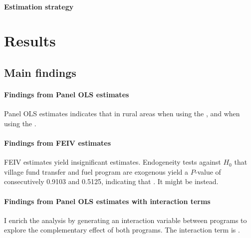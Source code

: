 \documentclass[letterpaper,12pt,leqno]{article}
\begin{document}
\paragraph{Estimation strategy}

\section{Results}\label{s:result}
\subsection{Main findings}\label{ss:findings}

\paragraph{Findings from Panel OLS estimates}
        Panel OLS estimates indicates that  in rural areas when using the , and  when using the . 
        
\paragraph{Findings from FEIV estimates}
        FEIV estimates yield insignificant estimates. Endogeneity tests against $H_0$ that village fund transfer and fuel program are exogenous yield a $P$-value of consecutively 0.9103 and 0.5125, indicating that . It might be  instead.

\paragraph{Findings from Panel OLS estimates with interaction terms}
        I enrich the analysis by generating an interaction variable between programs to explore the complementary effect of both programs. The interaction term is .
\end{document}

